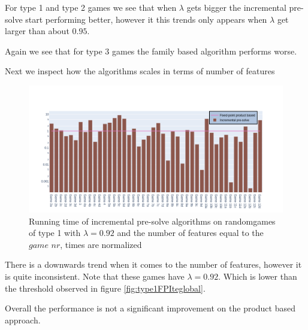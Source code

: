 For type 1 and type 2 games we see that when $\lambda$ gets bigger the incremental pre-solve start performing better, however it this trends only appears when $\lambda$ get larger than about $0.95$.

Again we see that for type 3 games the family based algorithm performs worse.

Next we inspect how the algorithms scales in terms of number of features
\begin{figure}[H]
	\includegraphics[width=1\linewidth]{"results/randomscalegames/Fixed-point product based_Incremental pre-solve_"}
	\caption{Running time of incremental pre-solve algorithms on randomgames of type 1 with $\lambda = 0.92$ and the number of features equal to the $\textit{game nr}$, times are normalized}
	\label{fig:elevatorzlnks}
\end{figure}%
There is a downwards trend when it comes to the number of features, however it is quite inconsistent. Note that these games have $\lambda=0.92$. Which is lower than the threshold observed in figure \ref{fig:type1FPIteglobal}.

Overall the performance is not a significant improvement on the product based approach.
